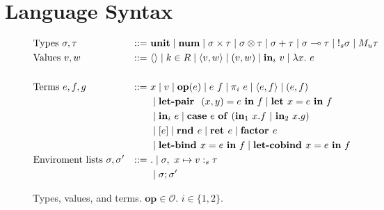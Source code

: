 \section{Language Syntax}

\begin{figure}[tbp]
  \begin{alignat*}{3}
         &\text{Types } \sigma, \tau &::=~ &\mathbf{unit}
         \mid \textbf{num}
         \mid \sigma \times \tau 
         \mid \sigma \otimes \tau
         \mid \sigma + \tau 
         \mid \sigma \multimap \tau
         \mid {{!_{s}} \sigma}
         \mid {M_u \tau}
         \\
         &\text{Values } v, w \ &::=~ &\langle \rangle
         \mid k \in R
         \mid \langle v,w \rangle 
         \mid (v, w)
         \mid \textbf{in}_i \ v
         \mid \lambda x.~e \\
         \\
         &\text{Terms } e, f, g &::=~ &x
         \mid v
         \mid \mathbf{op}(e)
         \mid e~f
         \mid {\pi}_i\ e
         \mid \langle e,f \rangle 
         \mid (e, f) \\
         & & & \mid \textbf{let-pair } \ (x,y) = e \ \textbf{in} \ f
         \mid \textbf{let } x  = e \ \textbf{in} \ f \\
         & & & \mid \textbf{in}_i \ e
         \mid 
          \mathbf{case} \ e \ \mathbf{of} \ (\textbf{in}_1 \ x.f \ | \ \textbf{in}_2 \ x.g) \\
         & & &
         \mid [e]
         \mid \textbf{rnd } e
         \mid {\textbf{ret }e} 
         \mid \textbf{factor } e \\
         & & & 
         \mid {\textbf{let-bind }x = e \ \textbf{in}\ f}
         \mid \textbf{let-cobind } x = e \ \textbf{in} \ f
         \\
         &\text{Enviroment lists } \sigma, \sigma' &::=~ &.
         \mid \sigma, \ x \mapsto v :_s \tau \\
         & & &
         \mid \sigma; \sigma'
  \end{alignat*}
  \caption{
    Types, values, and terms. 
    $\mathbf{op} \in \mathcal{O}$.
    $i \in \{1, 2\}$. 
  }
  \label{fig:syntax}
\end{figure}


